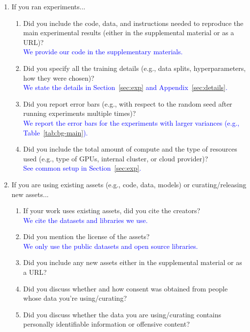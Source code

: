\begin{enumerate}
\item If you ran experiments...
\begin{enumerate}
  \item Did you include the code, data, and instructions needed to reproduce the main experimental results (either in the supplemental material or as a URL)?
    \answerYes{}\\
    \textcolor{blue}{We provide our code in the supplementary materials.}
  \item Did you specify all the training details (e.g., data splits, hyperparameters, how they were chosen)?
    \answerYes{}\\
    \textcolor{blue}{We state the details in Section~\ref{sec:exp} and Appendix~\ref{sec:details}.}
	\item Did you report error bars (e.g., with respect to the random seed after running experiments multiple times)?
    \answerYes{}\\
    \textcolor{blue}{We report the error bars for the experiments with larger variances (e.g., Table~\ref{tab:bg-main}).}
	\item Did you include the total amount of compute and the type of resources used (e.g., type of GPUs, internal cluster, or cloud provider)?
    \answerYes{}\\
    \textcolor{blue}{See common setup in Section~\ref{sec:exp}.}
\end{enumerate}

\item If you are using existing assets (e.g., code, data, models) or curating/releasing new assets...
\begin{enumerate}
  \item If your work uses existing assets, did you cite the creators?
    \answerYes{}\\
    \textcolor{blue}{We cite the datasets and libraries we use.}
  \item Did you mention the license of the assets?
    \answerYes{}\\
    \textcolor{blue}{We only use the public datasets and open source libraries.}
  \item Did you include any new assets either in the supplemental material or as a URL?
    \answerNA{}
  \item Did you discuss whether and how consent was obtained from people whose data you're using/curating?
    \answerNA{}
  \item Did you discuss whether the data you are using/curating contains personally identifiable information or offensive content?
    \answerNA{}
\end{enumerate}


\end{enumerate}
